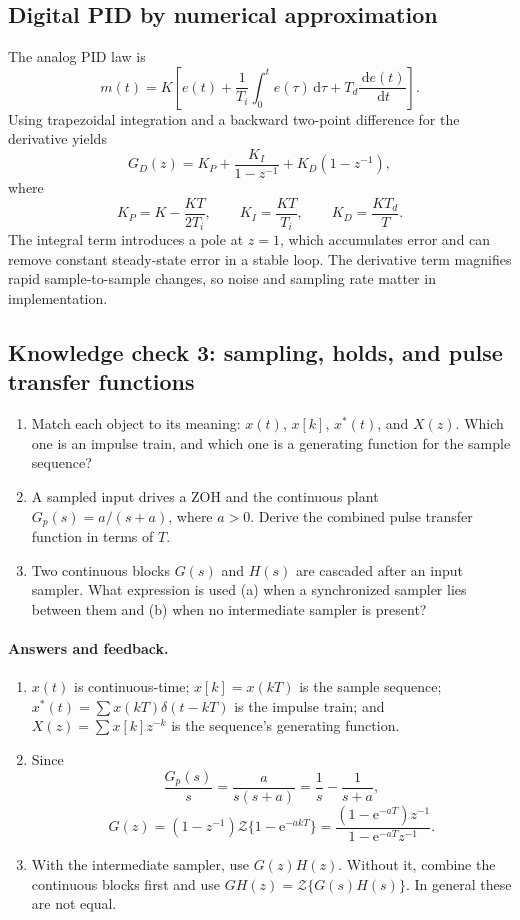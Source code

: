 \documentclass[11pt]{article}
\newcommand{\Z}{\mathcal{Z}}
\newcommand{\dd}{\,\mathrm{d}}
\newcommand{\e}{\mathrm{e}}
\begin{document}
\subsection{Digital PID by numerical approximation}

The analog PID law is
\[
m(t)=K\left[e(t)+\frac{1}{T_i}\int_0^t e(\tau)\dd\tau
+T_d\frac{\dd e(t)}{\dd t}\right].
\]
Using trapezoidal integration and a backward two-point difference for the derivative yields
\[
G_D(z)=K_P+\frac{K_I}{1-z^{-1}}+K_D(1-z^{-1}),
\]
where
\[
K_P=K-\frac{KT}{2T_i},\qquad
K_I=\frac{KT}{T_i},\qquad
K_D=\frac{KT_d}{T}.
\]
The integral term introduces a pole at $z=1$, which accumulates error and can remove constant steady-state error in a stable loop. The derivative term magnifies rapid sample-to-sample changes, so noise and sampling rate matter in implementation.

\subsection*{Knowledge check 3: sampling, holds, and pulse transfer functions}

\begin{enumerate}[label=\textbf{Q\arabic*.},wide]
  \item Match each object to its meaning: $x(t)$, $x[k]$, $x^*(t)$, and $X(z)$. Which one is an impulse train, and which one is a generating function for the sample sequence?
  \item A sampled input drives a ZOH and the continuous plant $G_p(s)=a/(s+a)$, where $a>0$. Derive the combined pulse transfer function in terms of $T$.
  \item Two continuous blocks $G(s)$ and $H(s)$ are cascaded after an input sampler. What expression is used (a) when a synchronized sampler lies between them and (b) when no intermediate sampler is present?
\end{enumerate}

\paragraph{Answers and feedback.}
\begin{enumerate}[label=\textbf{A\arabic*.},wide]
  \item $x(t)$ is continuous-time; $x[k]=x(kT)$ is the sample sequence; $x^*(t)=\sum x(kT)\delta(t-kT)$ is the impulse train; and $X(z)=\sum x[k]z^{-k}$ is the sequence's generating function.
  \item Since
  \[
  \frac{G_p(s)}{s}=\frac{a}{s(s+a)}=\frac1s-\frac1{s+a},
  \]
  \[
  G(z)=(1-z^{-1})\Z\{1-\e^{-akT}\}
  =\frac{(1-\e^{-aT})z^{-1}}{1-\e^{-aT}z^{-1}}.
  \]
  \item With the intermediate sampler, use $G(z)H(z)$. Without it, combine the continuous blocks first and use $GH(z)=\Z\{G(s)H(s)\}$. In general these are not equal.
\end{enumerate}
\end{document}
